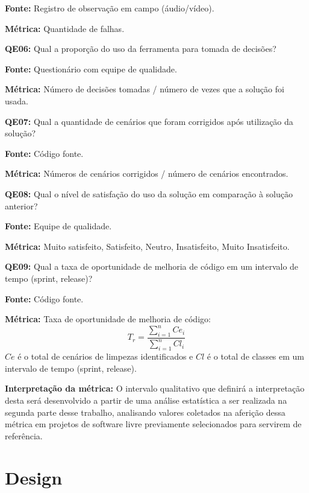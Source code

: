 \textbf{Fonte:} Registro de observação em campo (áudio/vídeo).

\textbf{Métrica:} Quantidade de falhas. \newline


\textbf{QE06: } Qual a proporção do uso da ferramenta para tomada de decisões?

\textbf{Fonte:} Questionário com equipe de qualidade.

\textbf{Métrica:} Número de decisões tomadas / número de vezes que a solução foi usada. \newline



\textbf{QE07: } Qual a quantidade de cenários que foram corrigidos após utilização da solução?

\textbf{Fonte:} Código fonte.

\textbf{Métrica:} Números de cenários corrigidos / número de cenários encontrados. \newline


\textbf{QE08: } Qual o nível de satisfação do uso da solução em comparação à solução anterior? 

\textbf{Fonte:} Equipe de qualidade.

\textbf{Métrica:} Muito satisfeito, Satisfeito, Neutro, Insatisfeito, Muito Insatisfeito. \newline


\textbf{QE09: } Qual a taxa de oportunidade de melhoria de código em um intervalo de tempo (sprint, release)? 

\textbf{Fonte:} Código fonte.

\textbf{Métrica:} Taxa de oportunidade de melhoria de código: $$ T_r =   \frac{{\sum_{i=1}^{n}{Ce_i}}}{\sum_{i=1}^{n}{Cl_i}} $$ $ Ce $ é o total de cenários de limpezas identificados e $ Cl $  é o total de classes em um intervalo de tempo (sprint, release).

\textbf{Interpretação da métrica:} O intervalo qualitativo que definirá a interpretação desta será desenvolvido a partir de uma análise estatística a ser realizada na segunda parte desse trabalho, analisando valores coletados na aferição dessa métrica em projetos de software livre previamente selecionados para servirem de referência. 

\section{Design} \label{sec:Design}

